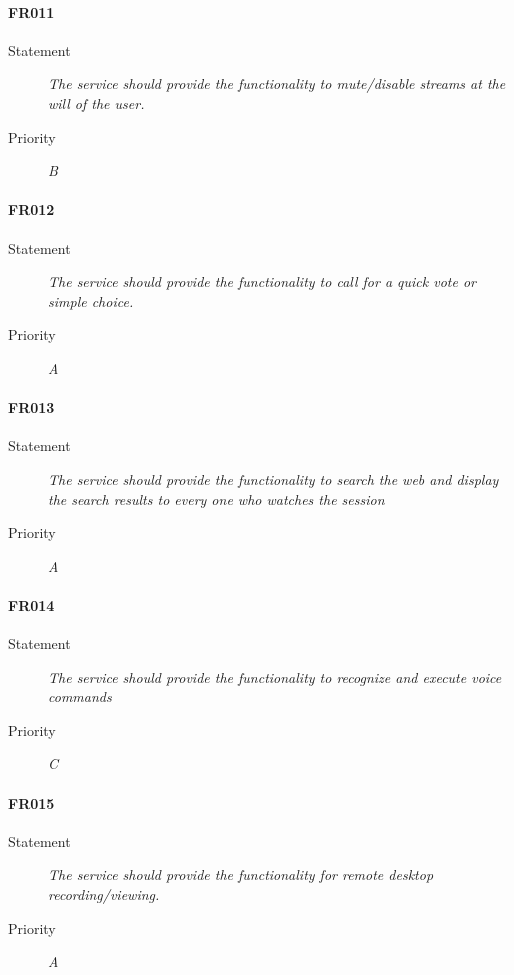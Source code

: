 \paragraph{FR011}
\begin{description}
  \item [Statement] 
    \textit{The service should provide the functionality to mute/disable streams at the will of the user.}
  \item [Priority] \textit{B}
\end{description}

\paragraph{FR012}
\begin{description}
  \item [Statement] 
    \textit{The service should provide the functionality to call for a quick vote or simple choice.}
  \item [Priority] \textit{A}
\end{description}

\paragraph{FR013}
\begin{description}
  \item [Statement] 
    \textit{The service should provide the functionality to search the web and display the search results to every one who watches the session}
  \item [Priority] \textit{A}
\end{description}

\paragraph{FR014}
\begin{description}
  \item [Statement] 
    \textit{The service should provide the functionality to recognize and execute voice commands}
  \item [Priority] \textit{C}
\end{description}

\paragraph{FR015}
\begin{description}
  \item [Statement] 
    \textit{The service should provide the functionality for remote desktop recording/viewing.}
  \item [Priority] \textit{A}
\end{description}

